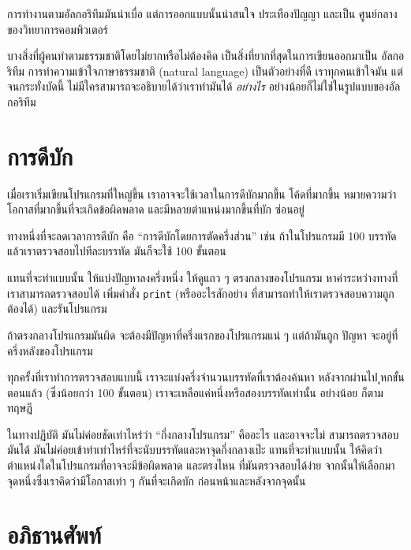 การทำงานตามอัลกอริทึมมันน่าเบื่อ แต่การออกแบบนั้นน่าสนใจ ประเทืองปัญญา และเป็น
ศูนย์กลางของวิทยาการคอมพิวเตอร์

บางสิ่งที่ผู้คนทำตามธรรมชาติโดยไม่ยากหรือไม่ต้องคิด เป็นสิ่งที่ยากที่สุดในการเขียนออกมาเป็น
อัลกอริทึม การทำความเข้าใจภาษาธรรมชาติ (natural language) เป็นตัวอย่างที่ดี
เราทุกคนเข้าใจมัน แต่จนกระทั่งบัดนี้ ไม่มีใครสามารถจะอธิบายได้ว่าเราทำมันได้ {\em อย่างไร}
อย่างน้อยก็ไม่ใช่ในรูปแบบของอัลกอริทึม


\section{การดีบัก}
\label{bisectbug}

เมื่อเราเริ่มเขียนโปรแกรมที่ใหญ่ขึ้น เราอาจจะใช้เวลาในการดีบักมากขึ้น โค้ดที่มากขึ้น 
หมายความว่า โอกาสที่มากขึ้นที่จะเกิดข้อผิดพลาด และมีหลายตำแหน่งมากขึ้นที่บัก
ซ่อนอยู่

ทางหนึ่งที่จะลดเวลาการดีบัก คือ ``การดีบักโดยการตัดครึ่งส่วน'' เช่น ถ้าในโปรแกรมมี
100 บรรทัด แล้วเราตรวจสอบไปทีละบรรทัด มันก็จะใช้ 100 ขั้นตอน

แทนที่จะทำแบบนั้น ให้แบ่งปัญหาลงครึ่งหนึ่ง ให้ดูแถว ๆ ตรงกลางของโปรแกรม 
หาค่าระหว่างทางที่เราสามารถตรวจสอบได้ เพิ่มคำสั่ง {\tt print}  (หรืออะไรสักอย่าง 
ที่สามารถทำให้เราตรวจสอบความถูกต้องได้) และรันโปรแกรม

ถ้าตรงกลางโปรแกรมมันผิด จะต้องมีปัญหาที่ครึ่งแรกของโปรแกรมแน่ ๆ แต่ถ้ามันถูก ปัญหา
จะอยู่ที่ครึ่งหลังของโปรแกรม

ทุกครั้งที่เราทำการตรวจสอบแบบนี้ เราจะแบ่งครึ่งจำนวนบรรทัดที่เราต้องค้นหา หลังจากผ่านไป
ุหกขั้นตอนแล้ว (ซึ่งน้อยกว่า 100 ขั้นตอน) เราจะเหลือแค่หนึ่งหรือสองบรรทัดเท่านั้น อย่างน้อย
ก็ตามทฤษฎี 

ในทางปฏิบัติ มันไม่ค่อยชัดเท่าไหร่ว่า ``กึ่งกลางโปรแกรม'' คืออะไร และอาจจะไม่
สามารถตรวจสอบมันได้ มันไม่ค่อยเข้าท่าเท่าไหร่ที่จะนับบรรทัดและหาจุดกึ่งกลางเป๊ะ 
แทนที่จะทำแบบนั้น ให้คิดว่าตำแหน่งใดในโปรแกรมที่อาจจะมีข้อผิดพลาด และตรงไหน
ที่มันตรวจสอบได้ง่าย จากนั้นให้เลือกมาจุดหนึ่งซึ่งเราคิดว่ามีโอกาสเท่า ๆ กันที่จะเกิดบัก
ก่อนหน้าและหลังจากจุดนั้น


\section{อภิธานศัพท์}

